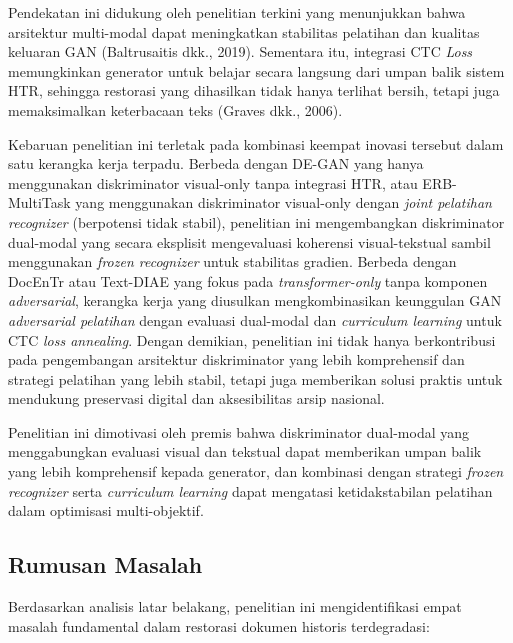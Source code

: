 \vspace{0.8em}
Pendekatan ini didukung oleh penelitian terkini yang menunjukkan bahwa arsitektur multi-modal dapat meningkatkan stabilitas pelatihan dan kualitas keluaran GAN (Baltrusaitis dkk., 2019). Sementara itu, integrasi CTC \textit{Loss} memungkinkan generator untuk belajar secara langsung dari umpan balik sistem HTR, sehingga restorasi yang dihasilkan tidak hanya terlihat bersih, tetapi juga memaksimalkan keterbacaan teks (Graves dkk., 2006).

\vspace{0.8em}
Kebaruan penelitian ini terletak pada kombinasi keempat inovasi tersebut dalam satu kerangka kerja terpadu. Berbeda dengan DE-GAN yang hanya menggunakan diskriminator visual-only tanpa integrasi HTR, atau ERB-MultiTask yang menggunakan diskriminator visual-only dengan \textit{joint pelatihan recognizer} (berpotensi tidak stabil), penelitian ini mengembangkan diskriminator dual-modal yang secara eksplisit mengevaluasi koherensi visual-tekstual sambil menggunakan \textit{frozen recognizer} untuk stabilitas gradien. Berbeda dengan DocEnTr atau Text-DIAE yang fokus pada \textit{transformer-only} tanpa komponen \textit{adversarial}, kerangka kerja yang diusulkan mengkombinasikan keunggulan GAN \textit{adversarial pelatihan} dengan evaluasi dual-modal dan \textit{curriculum learning} untuk CTC \textit{loss annealing}. Dengan demikian, penelitian ini tidak hanya berkontribusi pada pengembangan arsitektur diskriminator yang lebih komprehensif dan strategi pelatihan yang lebih stabil, tetapi juga memberikan solusi praktis untuk mendukung preservasi digital dan aksesibilitas arsip nasional.

\vspace{0.8em}
Penelitian ini dimotivasi oleh premis bahwa diskriminator dual-modal yang menggabungkan evaluasi visual dan tekstual dapat memberikan umpan balik yang lebih komprehensif kepada generator, dan kombinasi dengan strategi \textit{frozen recognizer} serta \textit{curriculum learning} dapat mengatasi ketidakstabilan pelatihan dalam optimisasi multi-objektif.
\vspace{0.8em}
\subsection{Rumusan Masalah}
\label{subsec:rumusan-masalah}

Berdasarkan analisis latar belakang, penelitian ini mengidentifikasi empat masalah fundamental dalam restorasi dokumen historis terdegradasi:

